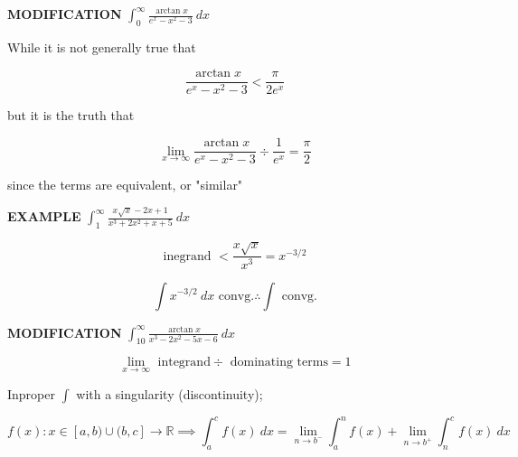 \documentclass{article}
\begin{document}
\vspace{10pt}

{\bf{}MODIFICATION} $\int_0^\infty\frac{\arctan x}{e^x-x^2-3}\ dx$

\vspace{10pt}

While it is not generally true that

\[\frac{\arctan x}{e^x-x^2-3}<\frac{\pi}{2e^x}\]

but it is the truth that

\[\lim_{x\to\infty}\frac{\arctan x}{e^x-x^2-3}\div\frac{1}{e^x}=\frac{\pi}{2}\]

since the terms are equivalent, or "similar"

\newpage

{\bf{}EXAMPLE} $\int_1^\infty\frac{x\sqrt{x}-2x+1}{x^3+2x^2+x+5}\ dx$

\[\mbox{inegrand }<\frac{x\sqrt{x}}{x^3}=x^{-3/2}\]

\[\int x^{-3/2}\ dx\mbox{ convg.}\therefore\int\mbox{ convg.}\]

\vspace{10pt}

{\bf{}MODIFICATION} $\int_{10}^\infty\frac{\arctan x}{x^3-2x^2-5x-6}\ dx$

\[\lim_{x\to\infty}\mbox{ integrand}\div\mbox{ dominating terms}=1\]

\vspace{10pt}

Inproper $\int$ with a singularity (discontinuity);

\[f(x):x\in[a,b)\cup(b,c]\to\mathbb{R}\implies\int_a^cf(x)\ dx=\lim_{n\to b^-}\int_a^nf(x)+\lim_{n\to b^+}\int_n^cf(x)\ dx\]
\end{document}
